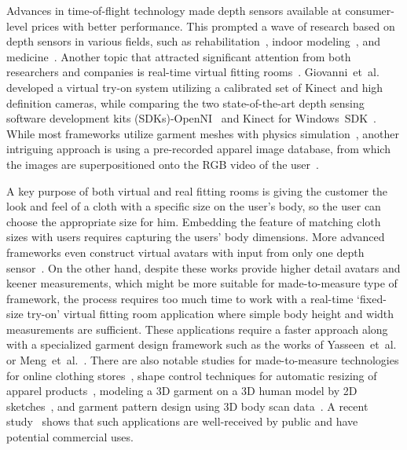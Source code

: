 Advances in time-of-flight technology made depth sensors available at consumer-level prices with better performance. This prompted a wave of research based on depth sensors in various fields, such as rehabilitation~\cite{Chang2011}, indoor modeling~\cite{Henry2012}, and medicine~\cite{Gallo2011}. Another topic that attracted significant attention from both researchers and companies is real-time virtual fitting rooms~\cite{Meng2010}. Giovanni~et~al.~\cite{Giovanni2012} developed a virtual try-on system utilizing a calibrated set of Kinect and high definition cameras, while comparing the two state-of-the-art depth sensing software development kits (SDKs)-OpenNI~\cite{OpenNI2102} and Kinect for Windows~SDK~\cite{Microsoft2013}. While most frameworks utilize garment meshes with physics simulation~\cite{Fitnect2012,Styku2013}, another intriguing approach is using a pre-recorded apparel image database, from which the images are superpositioned onto the RGB video of the user~\cite{Hauswiesner2013,Zhou2012}.  

A key purpose of both virtual and real fitting rooms is giving the customer the look and feel of a cloth with a specific size on the user's body, so the user can choose the appropriate size for him. Embedding the feature of matching cloth sizes with users requires capturing the users' body dimensions. More advanced frameworks even construct virtual avatars with input from only one depth sensor~\cite{Cui2013,Cui2010}. On the other hand, despite these works provide higher detail avatars and keener measurements, which might be more suitable for made-to-measure type of framework, the process requires too much time to work with a real-time `fixed-size try-on' virtual fitting room application
where simple body height and width measurements are sufficient. These applications require a faster approach along with a specialized garment design framework such as the works of Yasseen~et~al.~\cite{Yasseen2013} or Meng~et~al.~\cite{Meng2010}. There are also notable studies for made-to-measure technologies for online clothing stores~\cite{Cordier2003}, shape control techniques for automatic resizing of apparel products~\cite{Meng2012}, modeling a 3D garment on a 3D human model by 2D sketches~\cite{Wang2003}, and garment pattern design using 3D body scan data~\cite{Kim2003}. A recent study~\cite{Kim2013} shows that such applications are well-received by public and have potential commercial uses.     

